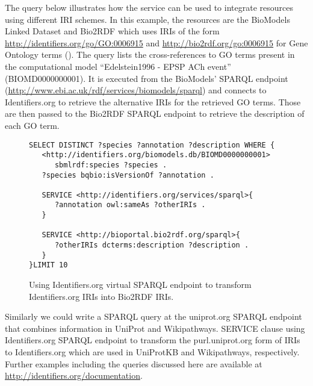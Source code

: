 \documentclass{bioinfo}
\begin{document}
The query below illustrates how the service can be used to integrate resources using different IRI schemes. 
In this example, the resources are the BioModels Linked Dataset and Bio2RDF which uses IRIs of the form \href{http://identifiers.org/go/GO:0006915}{http://identifiers.org/go/GO:0006915} and \href{http://bio2rdf.org/go:0006915} {http://bio2rdf.org/go:0006915} for Gene Ontology terms (\cite{Ashburner2000}). 
The query lists the cross-references to GO terms present in the computational model ``Edelstein1996 - EPSP ACh event'' (BIOMD0000000001).
It is executed from the BioModels' SPARQL endpoint (\href{http://www.ebi.ac.uk/rdf/services/biomodels/sparql}{http://www.ebi.ac.uk/rdf/services/biomodels/sparql}) and connects to Identifiers.org to retrieve the alternative IRIs for the retrieved GO terms. Those are then passed to the Bio2RDF SPARQL endpoint to retrieve the description of each GO term.

\begin{figure}[h]
{\scriptsize
\begin{verbatim}
SELECT DISTINCT ?species ?annotation ?description WHERE { 
   <http://identifiers.org/biomodels.db/BIOMD0000000001> 
      sbmlrdf:species ?species . 
   ?species bqbio:isVersionOf ?annotation .
	
   SERVICE <http://identifiers.org/services/sparql>{
      ?annotation owl:sameAs ?otherIRIs .
   }
		
   SERVICE <http://bioportal.bio2rdf.org/sparql>{
      ?otherIRIs dcterms:description ?description .
   }        
}LIMIT 10
\end{verbatim}
}
\caption{Using Identifiers.org virtual SPARQL endpoint to transform Identifiers.org IRIs into Bio2RDF IRIs.}
\label{translatestuff}
\end{figure}

Similarly we could write a SPARQL query at the uniprot.org SPARQL endpoint that combines information in UniProt and Wikipathways. SERVICE clause using Identifiers.org SPARQL endpoint to transform the purl.uniprot.org form of IRIs to Identifiers.org which are used in UniProtKB and Wikipathways, respectively. Further examples including the queries discussed here are available at \href{http://identifiers.org/documentation}{http://identifiers.org/documentation}.
\end{document}
